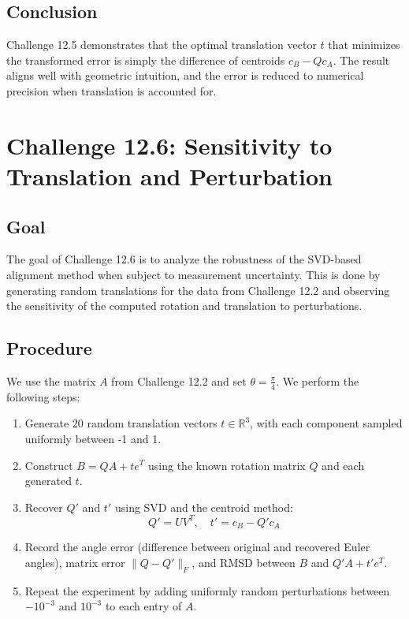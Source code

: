 \documentclass[12pt]{article}
\begin{document}
\subsection*{Conclusion}
Challenge 12.5 demonstrates that the optimal translation vector \( t \) that minimizes the transformed error is simply the difference of centroids \( c_B - Q c_A \). The result aligns well with geometric intuition, and the error is reduced to numerical precision when translation is accounted for.

\section*{Challenge 12.6: Sensitivity to Translation and Perturbation}

\subsection*{Goal}
The goal of Challenge 12.6 is to analyze the robustness of the SVD-based alignment method when subject to measurement uncertainty. This is done by generating random translations for the data from Challenge 12.2 and observing the sensitivity of the computed rotation and translation to perturbations.

\subsection*{Procedure}
We use the matrix \( A \) from Challenge 12.2 and set \( \theta = \frac{\pi}{4} \). We perform the following steps:

\begin{enumerate}
  \item Generate 20 random translation vectors \( t \in \mathbb{R}^3 \), with each component sampled uniformly between -1 and 1.
  \item Construct \( B = QA + te^T \) using the known rotation matrix \( Q \) and each generated \( t \).
  \item Recover \( Q' \) and \( t' \) using SVD and the centroid method:
  \[
  Q' = UV^T, \quad t' = c_B - Q'c_A
  \]
  \item Record the angle error (difference between original and recovered Euler angles), matrix error \( \|Q - Q'\|_F \), and RMSD between \( B \) and \( Q'A + t'e^T \).
  \item Repeat the experiment by adding uniformly random perturbations between \( -10^{-3} \) and \( 10^{-3} \) to each entry of \( A \).
\end{enumerate}
\end{document}
